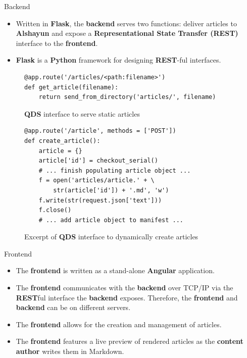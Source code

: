 \documentclass{beamer}
\begin{document}
\begin{frame}{Backend}
    \begin{itemize}
        \item Written in \textbf{Flask}, the \textbf{backend} serves two
            functions: deliver articles to \textbf{Alshayun} and expose a
            \textbf{Representational State Transfer (REST)} interface to the
            \textbf{frontend}.
        \item \textbf{Flask} is a \textbf{Python} framework for designing
            \textbf{REST}-ful interfaces.
    \end{itemize}
    \begin{figure}
    \begin{verbatim}
@app.route('/articles/<path:filename>')
def get_article(filename):
    return send_from_directory('articles/', filename)
    \end{verbatim}
    \caption{\textbf{QDS} interface to serve static articles}
    \end{figure}
    \begin{figure}
    \begin{verbatim}
@app.route('/article', methods = ['POST'])
def create_article():
    article = {}
    article['id'] = checkout_serial()
    # ... finish populating article object ...
    f = open('articles/article.' + \
        str(article['id']) + '.md', 'w')
    f.write(str(request.json['text']))
    f.close()
    # ... add article object to manifest ...
    \end{verbatim}
    \caption{Excerpt of \textbf{QDS} interface to dynamically create articles}
    \end{figure}
\end{frame}

\begin{frame}{Frontend}
    \begin{itemize}
        \item The \textbf{frontend} is written as a stand-alone \textbf{Angular}
            application.
        \item The \textbf{frontend} communicates with the \textbf{backend} over
            TCP/IP via the \textbf{REST}ful interface the \textbf{backend}
            exposes. Therefore, the \textbf{frontend} and \textbf{backend} can
            be on different servers.
        \item The \textbf{frontend} allows for the creation and management of
            articles.
        \item The \textbf{frontend} features a live preview of rendered articles
            as the \textbf{content author} writes them in Markdown.
    \end{itemize}
\end{frame}
\end{document}
